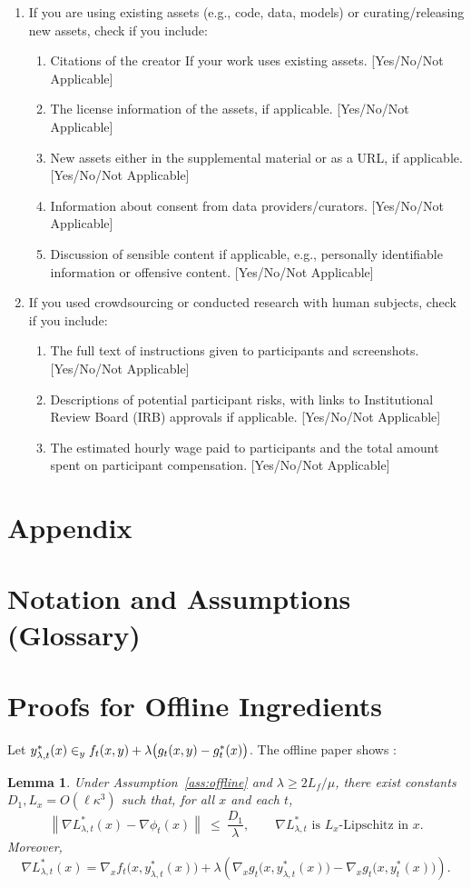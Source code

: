 \documentclass{uai2026} %
\let\argmin\relax
\DeclareMathOperator*{\argmin}{arg\,min}
\newtheorem{lemma}{Lemma}[section]
\newcommand{\norm}[1]{\left\lVert #1 \right\rVert}
\begin{document}
\begin{enumerate}
 \item If you are using existing assets (e.g., code, data, models) or curating/releasing new assets, check if you include:
 \begin{enumerate}
   \item Citations of the creator If your work uses existing assets. [Yes/No/Not Applicable]
   \item The license information of the assets, if applicable. [Yes/No/Not Applicable]
   \item New assets either in the supplemental material or as a URL, if applicable. [Yes/No/Not Applicable]
   \item Information about consent from data providers/curators. [Yes/No/Not Applicable]
   \item Discussion of sensible content if applicable, e.g., personally identifiable information or offensive content. [Yes/No/Not Applicable]
 \end{enumerate}

 \item If you used crowdsourcing or conducted research with human subjects, check if you include:
 \begin{enumerate}
   \item The full text of instructions given to participants and screenshots. [Yes/No/Not Applicable]
   \item Descriptions of potential participant risks, with links to Institutional Review Board (IRB) approvals if applicable. [Yes/No/Not Applicable]
   \item The estimated hourly wage paid to participants and the total amount spent on participant compensation. [Yes/No/Not Applicable]
 \end{enumerate}

 \end{enumerate}
\appendix
\section{Appendix}

\section{Notation and Assumptions (Glossary)}
\section{Proofs for Offline Ingredients}
Let $y^{*}_{\lambda,t}(x)\in\argmin_y f_t(x,y)+\lambda\big(g_t(x,y)-g_t^{*}(x)\big)$. The offline paper shows \citep[Lemma~4.1]{ChenMaZhang2025}:
\begin{lemma}\label{lem:offline-keys}
Under Assumption~\ref{ass:offline} and $\lambda\ge 2L_f/\mu$, there exist constants $D_1,L_x=O(\ell\kappa^3)$ such that, for all $x$ and each $t$,
\[
\norm{\nabla L^{*}_{\lambda,t}(x)-\nabla\phi_t(x)}\ \le\ \frac{D_1}{\lambda},
\qquad \nabla L^{*}_{\lambda,t}\text{ is }L_x\text{-Lipschitz in }x.
\]
Moreover,
\[
\nabla L^{*}_{\lambda,t}(x)
=\nabla_x f_t\big(x,y^{*}_{\lambda,t}(x)\big)
+\lambda\!\left(\nabla_x g_t\big(x,y^{*}_{\lambda,t}(x)\big)-\nabla_x g_t\big(x,y_t^{*}(x)\big)\right).
\]
\end{lemma}
\end{document}
